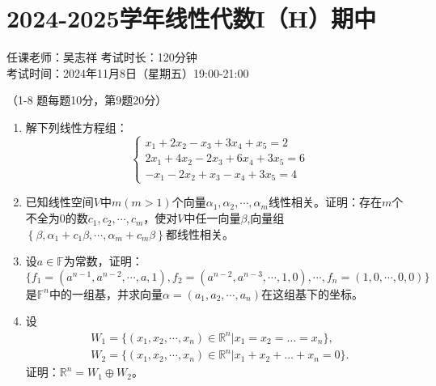 \section*{2024-2025学年线性代数I（H）期中}

\begin{center}
    任课老师：吴志祥\hspace{4em} 考试时长：120分钟 \\
    考试时间：2024年11月8日（星期五）19:00-21:00
\end{center}

（1-8 题每题10分，第9题20分）

\begin{enumerate}
    \item 解下列线性方程组：
          \[
              \begin{cases}
                  x_1 + 2x_2 - x_3 + 3x_4 +x_5 = 2     \\
                  2x_1 + 4x_2 - 2x_3 + 6x_4 + 3x_5 = 6 \\
                  -x_1 - 2x_2 + x_3 - x_4 + 3x_5 = 4
              \end{cases}
          \]

    \item 已知线性空间\(V\)中\(m(m > 1)\)个向量\(\alpha_1,\alpha_2,\cdots,\alpha_{m}\)线性相关。证明：存在\(m\)个不全为\(0\)的数\(c_1,c_2,\cdots,c_{m}\)，使对\(V\)中任一向量\(\beta\),向量组\(\left\{ \beta,\alpha_1 + c_1\beta,\cdots,\alpha_{m} + c_{m}\beta \right\}\)都线性相关。

    \item 设\(a \in \mathbb{F}\)为常数，证明：
          \[\{ f_1 = \left( a^{n - 1},a^{n - 2},\cdots,a,1 \right),f_2 = \left( a^{n - 2},a^{n - 3},\cdots,1,0 \right),\cdots,f_{n} = (1,0,\cdots,0,0)\}\]
          是\(\mathbb{F}^{n}\)中的一组基，并求向量\(\alpha = \left( a_1,a_2,\cdots,a_{n} \right)\)在这组基下的坐标。

    \item 设
          \begin{align*}
              W_1 = \{ \left( x_1,x_2,\cdots,x_{n} \right) \in  \mathbb{R}^{n} | x_1 = x_2 = \ldots = x_{n} \}, \\
              W_2 = \{ \left( x_1,x_2,\cdots,x_{n} \right) \in  \mathbb{R}^{n} | x_1 + x_2 + \ldots + x_{n} = 0 \}.
          \end{align*}
          证明：\(\mathbb{R}^{n} = W_1 \oplus W_2\)。


\end{enumerate}

